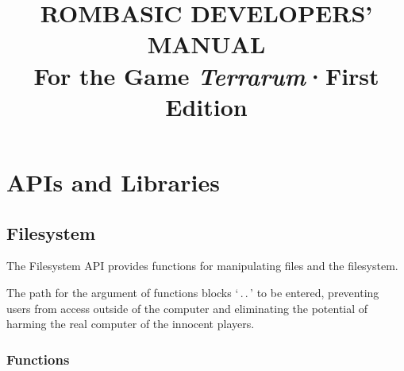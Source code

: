 \documentclass[10pt, stock]{memoir}
\title{\textbf{ROMBASIC DEVELOPERS' \\ MANUAL} \\ \vspace{7mm} \large For the Game \emph{Terrarum}\quad ·\quad First Edition}
\date{}
\author{}
\let\oldsection\section
\renewcommand\section{\clearpage\oldsection}
\begin{document}
\begin{titlingpage}
\maketitle{}
\end{titlingpage}

\setcounter{page}{3}

\tableofcontents*



\chapter{APIs and Libraries}

\section{Filesystem}

The Filesystem API provides functions for manipulating files and the filesystem.

The path for the argument of functions blocks `\,.\,.\,' to be entered, preventing users from access outside of the computer and eliminating the potential of harming the real computer of the innocent players.

\subsection{Functions}
\end{document}
